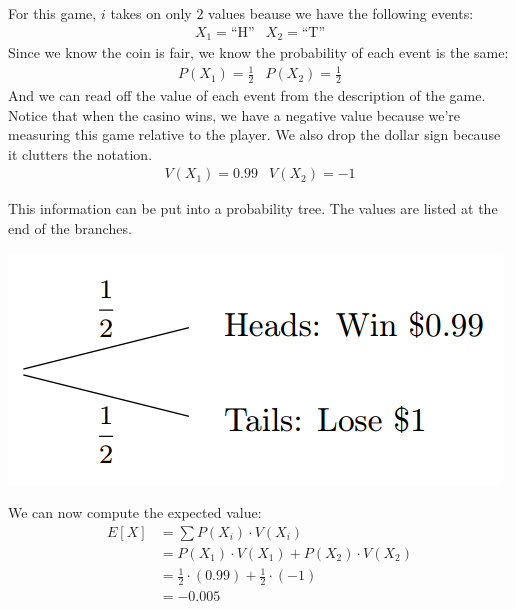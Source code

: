 \documentclass{ximera}
\begin{document}
For this game, $i$ takes on only $2$ values beause we have the following events:
\[ \begin{array}{cc}
      X_1 = \text{``H''} & X_2 = \text{``T''} 
\end{array} \]
Since we know the coin is fair, we know the probability of each event is the same:
\[ \begin{array}{cc}
      P(X_1) = \frac{1}{2} & P(X_2) = \frac{1}{2}
\end{array} \]
And we can read off the value of each event from the description of the game. Notice that when the casino wins, we have a negative value because we're measuring this game relative to the player. We also drop the dollar sign because it clutters the notation.
\[ \begin{array}{cc}
      V(X_1) = 0.99 & V(X_2) = -1
\end{array} \]

This information can be put into a probability tree. The values are listed at the end of the branches.

\begin{image}
\includegraphics{ExpectedValue1}
\end{image}

We can now compute the expected value:
\begin{align*}
  E[X] & = \sum P(X_i) \cdot V(X_i) \\
    & = P(X_1) \cdot V(X_1) + P(X_2) \cdot V(X_2) \\
    & = \frac{1}{2} \cdot (0.99) + \frac{1}{2} \cdot (-1) \\
    & = -0.005
\end{align*}
\end{document}
